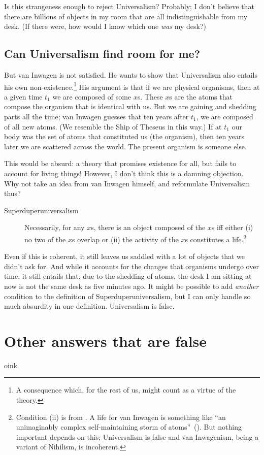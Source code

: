 Is this strangeness enough to reject Universalism? Probably; I don't believe that there are billions of objects in my room that are all indistinguishable from my desk. (If there were, how would I know which one {\em was} my desk?)

\subsection{Can Universalism find room for me?}
But van Inwagen is not satisfied. He wants to show that Universalism also entails his own non-existence.\footnote{A consequence which, for the rest of us, might count as a virtue of the theory.} His argument is that if we are physical organisms, then at a given time $t_{1}$ we are composed of some $x$s. These $x$s are the atoms that compose the organism that is identical with us. But we are gaining and shedding parts all the time; van Inwagen guesses that ten years after $t_{1}$, we are composed of all new atoms. (We resemble the Ship of Theseus in this way.) If at $t_{1}$ our body was the set of atoms that constituted us (the organism), then ten years later we are scattered across the world. The present organism is someone else.

This would be absurd: a theory that promises existence for all, but fails to account for living things! However, I don't think this is a damning objection. Why not take an idea from van Inwagen himself, and reformulate Universalism thus?
\begin{description}
	\item[Superduperuniversalism] Necessarily, for any $x$s, there is an object composed of the $x$s iff either (i) no two of the $x$s overlap or (ii) the activity of the $x$s constitutes a life.\footnote{Condition (ii) is from \citet[82]{inwagen1995}. A life for van Inwagen is something like ``an unimaginably complex self-maintaining storm of atoms''~(\citeyear[87]{inwagen1995}). But nothing important depends on this; Universalism is false and van Inwagenism, being a variant of Nihilism, is incoherent.}
\end{description}
Even if this is coherent, it still leaves us saddled with a lot of objects that we didn't ask for. And while it accounts for the changes that organisms undergo over time, it still entails that, due to the shedding of atoms, the desk I am sitting at now is not the same desk as five minutes ago. It might be possible to add {\em another} condition to the definition of Superduperuniversalism, but I can only handle so much absurdity in one definition. Universalism is false.

\section{Other answers that are false}
oink

%
%
%
%
